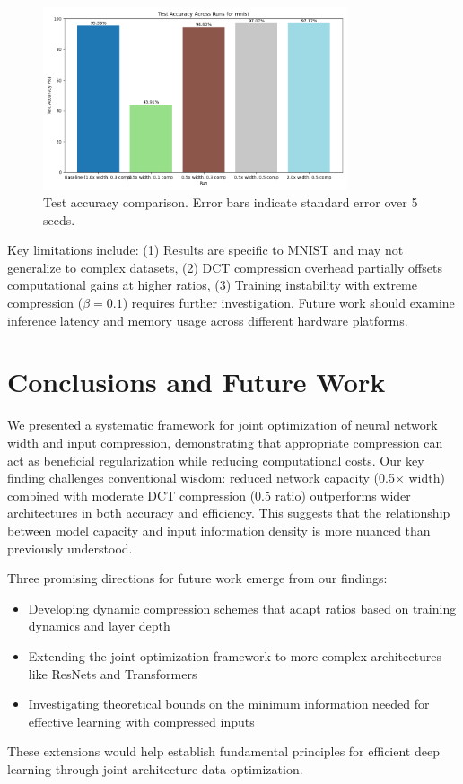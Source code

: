 \documentclass{article} %
\begin{document}
\begin{figure}[h]
    \centering
    \includegraphics[width=0.8\textwidth]{test_accuracy_mnist_across_runs.png}
    \caption{Test accuracy comparison. Error bars indicate standard error over 5 seeds.}
    \label{fig:test-accuracy}
\end{figure}

Key limitations include: (1) Results are specific to MNIST and may not generalize to complex datasets, (2) DCT compression overhead partially offsets computational gains at higher ratios, (3) Training instability with extreme compression ($\beta=0.1$) requires further investigation. Future work should examine inference latency and memory usage across different hardware platforms.

\section{Conclusions and Future Work}
\label{sec:conclusion}

We presented a systematic framework for joint optimization of neural network width and input compression, demonstrating that appropriate compression can act as beneficial regularization while reducing computational costs. Our key finding challenges conventional wisdom: reduced network capacity (0.5$\times$ width) combined with moderate DCT compression (0.5 ratio) outperforms wider architectures in both accuracy and efficiency. This suggests that the relationship between model capacity and input information density is more nuanced than previously understood.

Three promising directions for future work emerge from our findings:
\begin{itemize}
    \item Developing dynamic compression schemes that adapt ratios based on training dynamics and layer depth
    \item Extending the joint optimization framework to more complex architectures like ResNets and Transformers
    \item Investigating theoretical bounds on the minimum information needed for effective learning with compressed inputs
\end{itemize}

These extensions would help establish fundamental principles for efficient deep learning through joint architecture-data optimization.



\end{document}
